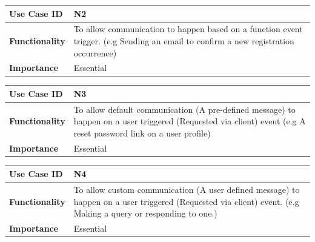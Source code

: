 \documentclass[a4paper,12pt]{article}
\begin{document}
        	\begin{center}
        		\begin{tabularx}{\textwidth}{ |X|X| }
        			
        			\hline
        			\textbf{Use Case ID} & N2 \\
        			\hline
        			\textbf{Functionality} & To allow communication to happen based on a function event trigger. (e.g Sending an email to confirm a new registration occurrence) \\
        			\hline
        			\textbf{Importance} & Essential \\
        			\hline
        			
        		\end{tabularx}
        	\end{center}
        	
        	\begin{center}
        		\begin{tabularx}{\textwidth}{ |X|X| }
        			
        			\hline
        			\textbf{Use Case ID} & N3 \\
        			\hline
        			\textbf{Functionality} & To allow default communication (A pre-defined message) to happen on a user triggered (Requested via client) event (e.g A reset password link on a user profile) \\
        			\hline
        			\textbf{Importance} & Essential \\
        			\hline
        			
        		\end{tabularx}
        	\end{center}
        	
        	\begin{center}
        		\begin{tabularx}{\textwidth}{ |X|X| }
        			
        			\hline
        			\textbf{Use Case ID} & N4 \\
        			\hline
        			\textbf{Functionality} & To allow custom communication (A user defined message) to happen on a user triggered (Requested via client) event. (e.g Making a query or responding to one.) \\
        			\hline
        			\textbf{Importance} & Essential \\
        			\hline
        			
        		\end{tabularx}
        	\end{center}
        	
\end{document}
